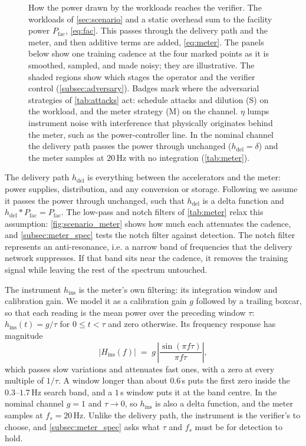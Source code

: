 \documentclass{article}
\begin{document}
\begin{figure}[t]
	\centering
	
	\caption{How the power drawn by the workloads reaches the verifier. The
	workloads of \cref{sec:scenario} and a static overhead sum to the facility
	power $P_{\mathrm{fac}}$, \cref{eq:fac}. This passes through the delivery
	path and the meter, and then additive terms are added, \cref{eq:meter}. The
	panels below show one training cadence at the four marked points as it is
	smoothed, sampled, and made noisy; they are illustrative. The shaded regions
	show which stages the operator and the verifier control
	(\cref{subsec:adversary}). Badges mark where the adversarial strategies of
	\cref{tab:attacks} act: schedule attacks and dilution (S) on the workload,
	and the meter strategy (M) on the channel. $\eta$ lumps instrument noise with
	interference that physically originates behind the meter, such as the
	power-controller line. In the nominal channel the delivery path
	passes the power through unchanged ($h_{\mathrm{del}} = \delta$) and the meter samples at $20$\,Hz with no integration
	(\cref{tab:meter}).}
	\label{fig:power_chain}
\end{figure}



The delivery path $h_{\mathrm{del}}$ is everything between the accelerators
and the meter: power supplies, distribution, and any conversion or storage.
Following \citet{ko2025widearea} we assume it passes the power through
unchanged, such that $h_{\mathrm{del}}$ is a delta function and
$h_{\mathrm{del}} * P_{\mathrm{fac}} = P_{\mathrm{fac}}$. The low-pass and
notch filters of \cref{tab:meter} relax this assumption:
\cref{fig:scenario_meter} shows how much each attenuates the cadence, and
\cref{subsec:meter_spec} tests the notch filter against detection. The notch
filter represents an anti-resonance, i.e. a narrow band of frequencies that the
delivery network suppresses. If that band sits near the cadence, it removes the
training signal while leaving the rest of the spectrum untouched.

The instrument $h_{\mathrm{ins}}$ is the meter's own filtering: its
integration window and calibration gain. We model it as a calibration gain $g$ followed by a
trailing boxcar, so that each reading is the mean power over the preceding
window $\tau$: $h_{\mathrm{ins}}(t) = g/\tau$ for $0 \le t < \tau$ and zero
otherwise. Its frequency response has magnitude
\begin{equation}
	\lvert H_{\mathrm{ins}}(f) \rvert \;=\; g\,
	\left\lvert \frac{\sin(\pi f \tau)}{\pi f \tau} \right\rvert,
	\label{eq:boxcar}
\end{equation}
which passes slow variations and attenuates fast ones, with a zero at every
multiple of $1/\tau$. A window longer than about $0.6$\,s puts the first zero
inside the $0.3$--$1.7$\,Hz search band, and a $1$\,s window puts it at the
band centre. In the nominal channel $g = 1$ and $\tau \to 0$, so
$h_{\mathrm{ins}}$ is also a delta function, and the meter samples at
$f_s = 20$\,Hz. Unlike the delivery path, the instrument is the verifier's to
choose, and \cref{subsec:meter_spec} asks what $\tau$ and $f_s$ must be for
detection to hold.
\end{document}
